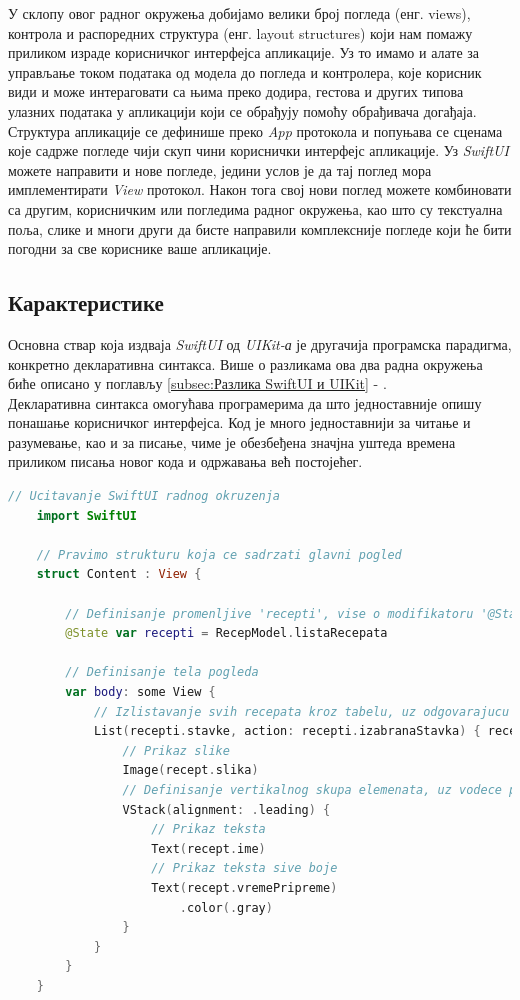 \documentclass[12pt,oneside]{memoir}
\begin{document}
\indent У склопу овог радног окружења добијамо велики број погледа (енг. views), контрола и распоредних структура (енг. layout structures) који нам помажу приликом израде корисничког интерфејса апликације. Уз то имамо и алате за управљање током података од модела до погледа и контролера, које корисник види и може интераговати са њима преко додира, гестова и других типова улазних података у апликацији који се обрађују помоћу обрађивача догађаја. 
\\
\indent Структура апликације се дефинише преко \textit{App} протокола и попуњава се сценама које садрже погледе чији скуп чини кориснички интерфејс апликације. Уз \textit{SwiftUI} можете направити и нове погледе, једини услов је да тај поглед мора имплементирати \textit{View} протокол. Након тога свој нови поглед можете комбиновати са другим, корисничким или погледима радног окружења, као што су текстуална поља, слике и многи други да бисте направили комплексније погледе који ће бити погодни за све кориснике ваше апликације.

\subsection{Карактеристике}

\indent Основна ствар која издваја \textit{SwiftUI} од \textit{UIKit-а} је другачија програмска парадигма, конкретно декларативна синтакса. Више о разликама ова два радна окружења биће описано у поглављу \ref{subsec:Разлика SwiftUI и UIKit} - . 
\\
\indent Декларативна синтакса омогућава програмерима да што једноставније опишу понашање корисничког интерфејса. Код је много једноставнији за читање и разумевање, као и за писање, чиме је обезбеђена значјна уштеда времена приликом писања новог кода и одржавања већ постојећег. 

\begin{lstlisting}[caption=\textit{{Пример SwiftUI кода}}, label={lst:Пример SwiftUI кода}, language=Swift, frame=single]
    // Ucitavanje SwiftUI radnog okruzenja
    import SwiftUI
    
    // Pravimo strukturu koja ce sadrzati glavni pogled
    struct Content : View {
    
        // Definisanje promenljive 'recepti', vise o modifikatoru '@State' u poglavlju '2.6 - Stanje i tok podataka'
        @State var recepti = RecepModel.listaRecepata
        
        // Definisanje tela pogleda
        var body: some View {
            // Izlistavanje svih recepata kroz tabelu, uz odgovarajucu akciju prilikom klika na neku celiju
            List(recepti.stavke, action: recepti.izabranaStavka) { recept in
                // Prikaz slike
                Image(recept.slika)
                // Definisanje vertikalnog skupa elemenata, uz vodece poravnanje
                VStack(alignment: .leading) {
                    // Prikaz teksta
                    Text(recept.ime)
                    // Prikaz teksta sive boje
                    Text(recept.vremePripreme)
                        .color(.gray)
                }
            }
        } 
    }
\end{lstlisting}
\end{document}
